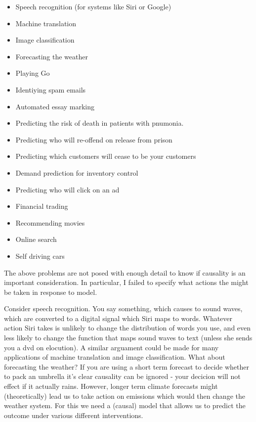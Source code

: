 \documentclass[11pt,a4paper]{article}
\begin{document}
\begin{itemize}
\item Speech recognition (for systems like Siri or Google)
\item Machine translation 
\item Image classification
\item Forecasting the weather
\item Playing Go 
\item Identiying spam emails
\item Automated essay marking
\item Predicting the risk of death in patients with pnumonia.
\item Predicting who will re-offend on release from prison 
\item Predicting which customers will cease to be your customers
\item Demand prediction for inventory control
\item Predicting who will click on an ad

\item Financial trading
\item Recommending movies
\item Online search
\item Self driving cars


\end{itemize}

The above problems are not posed with enough detail to know if causality is an important consideration. In particular, I failed to specify what actions the might be taken in response to model.

Consider speech recognition. You say something, which causes to sound waves, which are converted to a digital signal which Siri maps to words. Whatever action Siri takes is unlikely to change the distribution of words you use, and even less likely to change the function that maps sound waves to text (unless she sends you a dvd on elocution). A similar arguament could be made for many applications of machine translation and image classification. What about forecasting the weather? If you are using a short term forecast to decide whether to pack an umbrella it's clear causality can be ignored - your decicion will not effect if it actually rains. However, longer term climate forecasts might (theoretically) lead us to take action on emissions which would then change the weather system. For this we need a (causal) model that allows us to predict the outcome under various different interventions.
\end{document}
